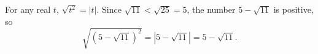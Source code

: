 For any real $t$, $\sqrt{t^2}=|t|$. Since $\sqrt{11}<\sqrt{25}=5$, the number $5-\sqrt{11}$ is positive, so
\[
\sqrt{\left(5-\sqrt{11}\right)^2}=\left|5-\sqrt{11}\right|=\boxed{5-\sqrt{11}}.
\]
